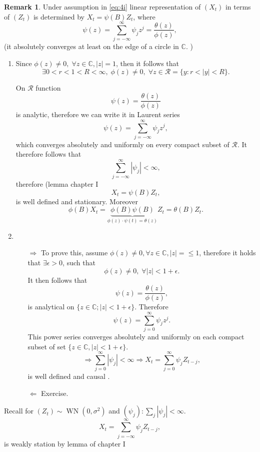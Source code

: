 \documentclass[12pt,a4paper, notitlepage]{book}
\theoremstyle{definition} %
\newtheorem{remark}[definition]{Remark}
\theoremstyle{plain} %
\newcommand{\C}{\mathbb C}
\DeclareMathOperator{\Wn}{WN}
\begin{document}
\begin{remark} 
Under assumption in \ref{eq:4i} linear representation of $ (X_t) $ in 
terms of $ (Z_t ) $ is determined by $ X_t = \psi (B) Z_t $, where
\[ \psi (z) = \sum_{j=- \infty} ^{\infty} \psi _j z^j = \frac{ \theta(z) }{ \phi(z)} , \]
(it absolutely converges at least on the edge of a circle in $ \C $. )
\end{remark}
\proof 
\begin{enumerate}
\item
 Since $ \phi (z) \neq 0 , \; \forall z \in \C , |z| = 1 $, then  it follows that
\[ \exists 0 < r < 1 < R < \infty ,  \; \phi (z) \neq 0 , \; \forall z \in \mathcal{R} = \{ y: r < |y| < R \} . \]
 
On $ \mathcal{R} $ function 
\[ \psi (z) = \frac{ \theta(z) }{\phi(z)}  \] 
is analytic, therefore we can write it in Laurent series 
\[ \psi (z) = \sum _{j=- \infty } ^{\infty} \psi _j z^j , \] 
which converges absolutely and uniformly on every compact subset of $ \mathcal {R} $.
It therefore follows that
\[    \sum _{j=- \infty} ^{\infty} | \psi _j | <  \infty  , \]
therefore  (lemma chapter I %
\[ X_t = \psi (B) Z_t , \]
is well defined and stationary. Moreover 
\[ \phi (B) X_t  = \underbrace{ \phi(B) \psi(B) } _{ \phi(z) \cdot \psi(t) = \theta(z) } Z_t = \theta (B) Z_t . \]

\item
\begin{itemize}
\item[$\Rightarrow$] To prove this, assume $ \phi (z) \neq 0 , \forall z \in \C, |z| =  \leq 1 $, therefore it holds that $ \exists \epsilon >0 $, such that 
\[ \phi (z) \neq 0 ,  \; \forall |z| < 1 + \epsilon . \]
It then follows that 
\[ \psi (z) = \frac{ \theta (z) }{ \phi (z) } , \] 
is analytical on $ \{ z \in \C ; |z| <1 + \epsilon \} $. Therefore
\[ \psi (z) = \sum _{j=0} ^{\infty}  \psi _j z^j . \] 
This power series converges absolutely and uniformly on each compact subset of set $ \{ z \in \C, |z| < 1 + \epsilon \} $.
\[ \Rightarrow \sum _{j=0} ^{\infty} |\psi _j | < \infty \Rightarrow X_t = \sum _{j=0} ^{\infty} \psi _j Z_{t-j} , \]
is well defined and 
causal .
\item[$\Leftarrow $] Exercise.
\end{itemize}
\end{enumerate}

Recall for $ (Z_t) \sim \Wn(0, \sigma ^2) $ and $ ( \psi _j) : \sum _j |\psi _j | < \infty $.
\[ X_t = \sum _{j= - \infty }^{\infty} \psi _j Z_{t-j} , \]
is weakly station by lemma of chapter I %
\end{document}
